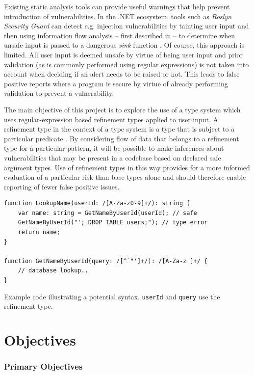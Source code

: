 \documentclass[a4paper,openany,12pt]{book}
\begin{document}
Existing static analysis tools can provide useful warnings that help prevent introduction of vulnerabilities.
In the .NET ecosystem, tools such as \emph{Roslyn Security Guard} can detect e.g. injection vulnerabilities by tainting
user input and then using information flow analysis -- first described in \cite{denning1977certification} -- to
determine when unsafe input is passed to a dangerous \emph{sink} function \citep{rosylynsecguard}.
Of course, this approach is limited.
All user input is deemed unsafe by virtue of being user input and prior validation (as is commonly performed using
regular expressions) is not taken into account when deciding if an alert needs to be raised or not.
This leads to false positive reports where a program is secure by virtue of already performing validation to prevent a
vulnerability.

The main objective of this project is to explore the use of a type system which uses regular-expression based refinement
types applied to user input.
A refinement type in the context of a type system is a type that is subject to a particular predicate \citep[p.
207]{benjaminpierce2002}.
By considering flow of data that belongs to a refinement type for a particular pattern, it will be possible to make
inferences about vulnerabilities that may be present in a codebase based on declared safe argument types.
Use of refinement types in this way provides for a more informed evaluation of a particular risk than base types alone
and should therefore enable reporting of fewer false positive issues.

\begin{listing}[H]
    \begin{verbatim}
function LookupName(userId: /[A-Za-z0-9]+/): string {
    var name: string = GetNameByUserId(userId); // safe
    GetNameByUserId("'; DROP TABLE users;"); // type error
    return name;
}

function GetNameByUserId(query: /[^`"']+/): /[A-Za-z ]+/ {
    // database lookup..
}
    \end{verbatim}
    \caption{Example code illustrating a potential syntax. \texttt{userId} and \texttt{query} use the refinement type.}
\end{listing}
\section*{Objectives}



\subsubsection*{Primary Objectives}
\end{document}
